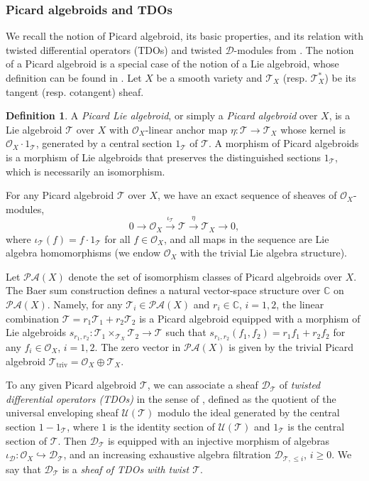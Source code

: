 \documentclass[11pt, a4paper]{amsart}
\newcommand{\C}{\mathbb{C}}
\newcommand{\sD}{\mathscr{D}}
\newcommand{\T}{\mathcal{T}}
\newcommand{\TT}{\mathscr{T}}
\newcommand{\PicAlg}{\mathscr{PA}}
\newcommand{\OO}{\mathcal{O}}
\theoremstyle{definition}
\newtheorem{defi}[Thm]{Definition}
\numberwithin{equation}{section}
\begin{document}
\subsubsection{Picard algebroids and TDOs} \label{subsec:pic_defn}

We recall the notion of Picard algebroid, its basic properties, and its relation with twisted differential operators (TDOs) and twisted $\mathscr{D}$-modules from \cite[Section 2]{BeilinsonBernstein}. The notion of a Picard algebroid is a special case of the notion of a Lie algebroid, whose definition can be found in \cite[Section 1.2]{BeilinsonBernstein}. Let $X$ be a smooth variety and $\T_X$ (resp. $\T_X^*$) be its tangent (resp. cotangent) sheaf. 

\begin{defi} \label{defn:pic}
	A {\it Picard Lie algebroid}, or simply a {\it Picard algebroid} over $X$, is a Lie algebroid $\TT$ over $X$ with $\OO_X$-linear anchor map $\eta: \TT \to \T_X$ whose kernel is $\OO_X \cdot 1_{\TT}$, generated by a central section $1_{\TT}$ of $\TT$. 
	A morphism of Picard algebroids is a morphism of Lie algebroids that preserves the distinguished sections $1_{\TT}$, which is necessarily an isomorphism.
\end{defi}

For any Picard algebroid $\TT$ over $X$, we have an exact sequence of sheaves of $\OO_X$-modules,
	\[ 0 \to \OO_X \xrightarrow{\iota_\TT} \TT \xrightarrow{\eta} \T_X \to 0, \]
where $\iota_\TT(f) = f \cdot 1_{\TT}$ for all $f \in \OO_X$, and all maps in the sequence are Lie algebra homomorphisms (we endow $\OO_X$ with the trivial Lie algebra structure).

Let $\PicAlg(X)$ denote the set of isomorphism classes of Picard algebroids over $X$. The Baer sum construction defines a natural vector-space structure over $\C$ on $\PicAlg(X)$. 
Namely, for any $\TT_i \in \PicAlg(X)$ and $r_i \in \C$, $i = 1,2$, the linear combination $\TT = r_1 \TT_1 + r_2 \TT_2$ is a Picard algebroid equipped with a morphism of Lie algebroids $s_{r_1, r_2}: \TT_1 \times_{\T_X} \TT_2 \to \TT$ such that $s_{r_1, r_2} (f_1, f_2) = r_1 f_1 + r_2 f_2$ for any $f_i \in \OO_X$, $i = 1,2$.
The zero vector in $\PicAlg(X)$ is given by the trivial Picard algebroid $\TT_{\operatorname{triv}} = \OO_X \oplus \T_X$.

To any given Picard algebroid $\TT$, we can associate a sheaf $\sD_\TT$ of \emph{twisted differential operators (TDOs)} in the sense of \cite[Definition 2.1.1]{BeilinsonBernstein}, defined as the quotient of the universal enveloping sheaf $\mathscr{U}(\TT)$ modulo the ideal generated by the central section $1 - 1_\TT$, where $1$ is the identity section of $\mathscr{U}(\TT)$ and $1_\TT$ is the central section of $\TT$. Then $\sD_\TT$ is equipped with an injective morphism of algebras $\iota_{\sD}: \OO_X \hookrightarrow \sD_{\TT}$, and an increasing exhaustive algebra filtration $\sD_{\TT, \leqslant i}$, $i \geqslant 0$. We say that $\sD_\TT$ is a {\it sheaf of TDOs with twist $\TT$}.
\end{document}
